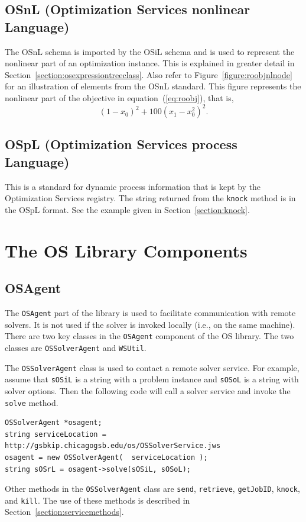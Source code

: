 \documentclass[11pt]{article}
\newcounter{Fig}
\renewcommand{\_}{{\char"5F}}
\renewcommand{\{}{{\char"7B}}
\renewcommand{\}}{{\char"7D}}
\renewcommand{\^}{{\char"0D}}
\renewcommand{\'}{{\char"0D}}
\begin{document}
\begin{enumerate}[Step 1:]
\subsection{OSnL (Optimization Services nonlinear Language)} \label{section:osnlschema}
The OSnL schema is imported by the OSiL schema and is used 
to represent the nonlinear part of an optimization instance. 
This is explained in greater detail in Section~\ref{section:osexpressiontreeclass}. Also refer to
Figure~\ref{figure:roobjnlnode} for an illustration of elements from the OSnL standard. This figure represents
the nonlinear part of the objective in equation~(\ref{eq:roobj}), that is,
%
$$
(1-x_0)^2 + 100 (x_1-x_0^2)^2.
$$

\subsection{OSpL (Optimization Services process Language)} \label{section:osplschema}
This
is a standard for dynamic process information that is kept by the Optimization Services registry.
The string returned from the {\tt knock} method is in the OSpL format. See the example given in Section~\ref{section:knock}.




\section{The OS Library Components}\label{section:oslibrary}

\subsection{OSAgent}\label{section:osagent}

The {\tt OSAgent}  part of the library is used to facilitate communication
with remote solvers. It is not used if the solver is invoked locally (i.e., on the same machine).
There are two key classes in the {\tt OSAgent} component of the OS library. The two classes are
{\tt OSSolverAgent} and {\tt WSUtil}.

The {\tt OSSolverAgent} class is used to contact a remote solver service.  For example, assume that {\tt sOSiL}
is a string with a problem instance and {\tt sOSoL} is a string with solver options. Then the following code
will call a solver service and invoke the {\tt solve} method.
\begin{verbatim}
OSSolverAgent *osagent;
string serviceLocation = http://gsbkip.chicagogsb.edu/os/OSSolverService.jws
osagent = new OSSolverAgent(  serviceLocation );
string sOSrL = osagent->solve(sOSiL, sOSoL);
\end{verbatim}
Other methods in the {\tt OSSolverAgent} class are {\tt send}, {\tt retrieve}, {\tt getJobID}, {\tt knock}, and {\tt kill}.  The use of these methods is described in Section~\ref{section:servicemethods}.




\end{enumerate}
\end{document}

